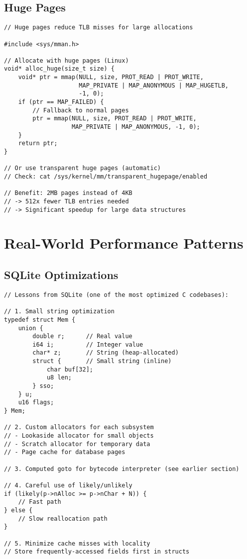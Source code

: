 \subsection{Huge Pages}

\begin{lstlisting}
// Huge pages reduce TLB misses for large allocations

#include <sys/mman.h>

// Allocate with huge pages (Linux)
void* alloc_huge(size_t size) {
    void* ptr = mmap(NULL, size, PROT_READ | PROT_WRITE,
                     MAP_PRIVATE | MAP_ANONYMOUS | MAP_HUGETLB,
                     -1, 0);
    if (ptr == MAP_FAILED) {
        // Fallback to normal pages
        ptr = mmap(NULL, size, PROT_READ | PROT_WRITE,
                   MAP_PRIVATE | MAP_ANONYMOUS, -1, 0);
    }
    return ptr;
}

// Or use transparent huge pages (automatic)
// Check: cat /sys/kernel/mm/transparent_hugepage/enabled

// Benefit: 2MB pages instead of 4KB
// -> 512x fewer TLB entries needed
// -> Significant speedup for large data structures
\end{lstlisting}

\section{Real-World Performance Patterns}

\subsection{SQLite Optimizations}

\begin{lstlisting}
// Lessons from SQLite (one of the most optimized C codebases):

// 1. Small string optimization
typedef struct Mem {
    union {
        double r;      // Real value
        i64 i;         // Integer value
        char* z;       // String (heap-allocated)
        struct {       // Small string (inline)
            char buf[32];
            u8 len;
        } sso;
    } u;
    u16 flags;
} Mem;

// 2. Custom allocators for each subsystem
// - Lookaside allocator for small objects
// - Scratch allocator for temporary data
// - Page cache for database pages

// 3. Computed goto for bytecode interpreter (see earlier section)

// 4. Careful use of likely/unlikely
if (likely(p->nAlloc >= p->nChar + N)) {
    // Fast path
} else {
    // Slow reallocation path
}

// 5. Minimize cache misses with locality
// Store frequently-accessed fields first in structs
\end{lstlisting}

